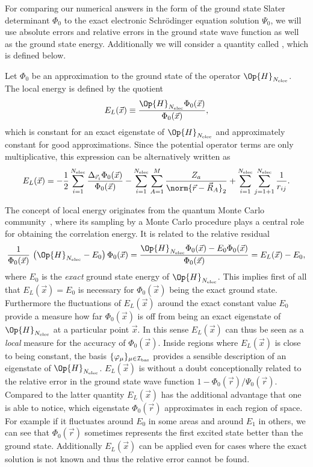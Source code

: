 For comparing our numerical answers in the form of the \HF
ground state Slater determinant $\Phi_0$
to the exact electronic Schrödinger equation solution $\Psi_0$,
we will use absolute errors and relative errors in the ground state wave function
as well as the ground state energy.
Additionally we will consider a quantity called ,
which is defined below.
\begin{defn}
	Let $\Phi_0$ be an approximation to the ground state
	of the operator $\Op{H}_{\Nelec}$.
	The local energy is defined by the quotient
	\begin{equation}
		E_L(\vec{x}) \equiv \frac{\Op{H}_{\Nelec} \Phi_0(\vec{x})}{\Phi_0(\vec{x})},
		\label{eqn:LocalEnergy}
	\end{equation}
	which is constant for an exact eigenstate of $\Op{H}_{\Nelec}$
	and approximately constant for good approximations.
	Since the potential operator terms are only multiplicative,
	this expression can be alternatively written as
	\[
		E_L(\vec{x})
		= -\frac12 \sum_{i=1}^{\Nelec} \frac{\Delta_{\vec{r}_i} \Phi_0(\vec{x})}{\Phi_0(\vec{x})}
		- \sum_{i=1}^{\Nelec} \sum_{A=1}^M \frac{Z_a}{\norm{\vec{r} - \vec{R}_A}_2}
		+ \sum_{i=1}^{\Nelec} \sum_{j=1+1}^{\Nelec} \frac{1}{r_{ij}}.
	\]
\end{defn}
The concept of local energy originates from the
quantum Monte Carlo community~\cite{Foulkes2001,Ma2005},
where its sampling by a Monte Carlo procedure plays a central role
for obtaining the correlation energy.
It is related to the relative residual
\[
	\frac{1}{\Phi_0(\vec{x})} \, \left(\Op{H}_{\Nelec} - E_0\right) \Phi_0(\vec{x}) =
	\frac{\Op{H}_{\Nelec} \Phi_0(\vec{x}) - E_0 \Phi_0(\vec{x})}{\Phi_0(\vec{x})}
	= E_L(\vec{x}) - E_0,
\]
where $E_0$ is the \emph{exact} ground state energy of $\Op{H}_{\Nelec}$.
This implies first of all
that $E_L(\vec{x}) = E_0$ is necessary for $\Phi_0(\vec{x})$ being the exact ground state.
Furthermore the fluctuations of $E_L(\vec{x})$ around the exact constant value $E_0$
provide a measure how far $\Phi_0(\vec{x})$ is off from being an
exact eigenstate of $\Op{H}_{\Nelec}$ at a particular point $\vec{x}$.
In this sense $E_L(\vec{x})$ can thus be seen as a \emph{local} measure
for the accuracy of $\Phi_0(\vec{x})$.
Inside regions where $E_L(\vec{x})$ is close to being constant,
the basis $\{\varphi_\mu\}_{\mu\in\mathcal{I}_\text{bas}}$ provides a sensible description
of an eigenstate of $\Op{H}_{\Nelec}$.
$E_L(\vec{x})$ is without a doubt conceptionally related to the
relative error in the ground state wave function $1 - \Phi_0(\vec{r}) / \Psi_0(\vec{r})$.
Compared to the latter quantity $E_L(\vec{x})$
has the additional advantage that one is able to notice,
which eigenstate $\Phi_0(\vec{r})$ approximates in each region of space.
For example if it fluctuates around $E_0$ in some areas and around $E_1$ in others,
we can see that $\Phi_0(\vec{r})$ sometimes represents the first excited state
better than the ground state.
Additionally $E_L(\vec{x})$ can be applied even for cases where
the exact solution is not known and thus the relative error cannot be found.

